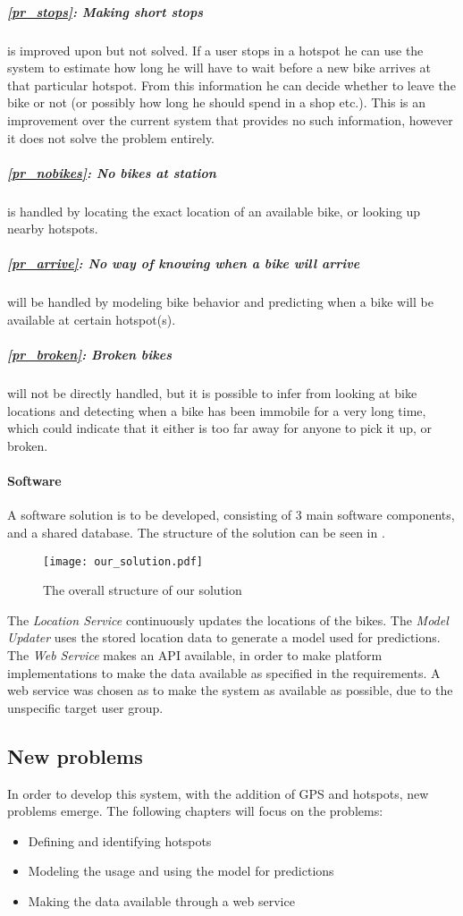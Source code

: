 \subparagraph{\ref{pr_stops}: Making short stops} is improved upon but not solved.
If a user stops in a hotspot he can use the system to estimate how long he will have to wait before a new bike arrives at that particular hotspot.
From this information he can decide whether to leave the bike or not (or possibly how long he should spend in a shop etc.).
This is an improvement over the current system that provides no such information, however it does not solve the problem entirely.

\subparagraph{\ref{pr_nobikes}: No bikes at station} is handled by locating the exact location of an available bike, or looking up nearby hotspots.

\subparagraph{\ref{pr_arrive}: No way of knowing when a bike will arrive} will be handled by modeling bike behavior and predicting when a bike will be available at certain hotspot(s).

\subparagraph{\ref{pr_broken}: Broken bikes} will not be directly handled, but it is possible to infer from looking at bike locations and detecting when a bike has been immobile for a very long time, which could indicate that it either is too far away for anyone to pick it up, or broken.

\paragraph{Software}
A software solution is to be developed, consisting of 3 main software components, and a shared database.
The structure of the solution can be seen in .

\begin{figure}[h]
\texttt{[image: our\_solution.pdf]}
\caption{The overall structure of our solution}
\label{fig:solution_structure}
\end{figure}

The \textit{Location Service} continuously updates the locations of the bikes.
The \textit{Model Updater} uses the stored location data to generate a model used for predictions.
The \textit{Web Service} makes an API available, in order to make platform implementations to make the data available as specified in the requirements.
A web service was chosen as to make the system as available as possible, due to the unspecific target user group.

\subsection{New problems}
In order to develop this system, with the addition of GPS and hotspots, new problems emerge.
The following chapters will focus on the problems:

\begin{itemize}
\item Defining and identifying hotspots
\item Modeling the usage and using the model for predictions
\item Making the data available through a web service
\end{itemize}